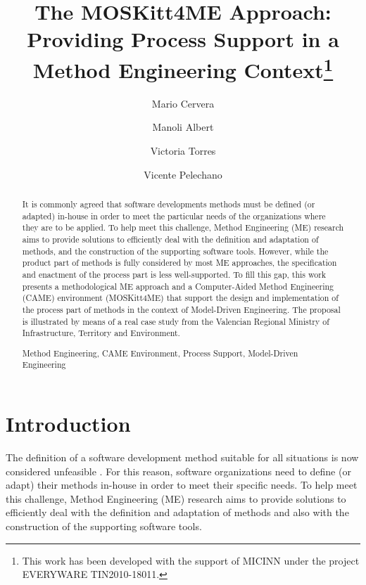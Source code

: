 \documentclass[runningheads,a4paper]{llncs}
\newcommand{\keywords}[1]{\par\addvspace\baselineskip
\noindent\keywordname\enspace\ignorespaces#1}
\begin{document}
\mainmatter  %

\title{The MOSKitt4ME Approach: Providing Process Support in a Method
Engineering Context\thanks{This work has been developed with the support of
MICINN under the project EVERYWARE TIN2010-18011.}}

\author{Mario Cervera \and Manoli Albert \and Victoria Torres \and Vicente
Pelechano}


\maketitle

\begin{abstract}

It is commonly agreed that software developments methods must be defined
(or adapted) in-house in order to meet the particular needs of the organizations
where they are to be applied. To help meet this challenge, Method Engineering
(ME) research aims to provide solutions to efficiently deal with the definition
and adaptation of methods, and the construction of the supporting software
tools. However, while the product part of methods is fully considered by most ME
approaches, the specification and enactment of the process part is less
well-supported. To fill this gap, this work presents a methodological ME
approach and a Computer-Aided Method Engineering (CAME) environment (MOSKitt4ME)
that support the design and implementation of the process part of methods in the
context of Model-Driven Engineering. The proposal is illustrated by means of a
real case study from the Valencian Regional Ministry of Infrastructure,
Territory and Environment.

\keywords{Method Engineering, CAME Environment, Process Support, Model-Driven
Engineering}
\end{abstract}

\section{Introduction}

The definition of a software development method suitable for all situations is
now considered unfeasible \cite{Cockburn00,HendersonSellers10}. For
this reason, software organizations need to define (or adapt) their methods
in-house in order to meet their specific needs. To help meet this challenge,
Method Engineering (ME) research aims to provide solutions
\cite{Brinkkemper99,Karlsson04,Prakash97,Ralyte01a} to efficiently deal with the
definition and adaptation of methods and also with the construction of the
supporting software tools.
\end{document}
